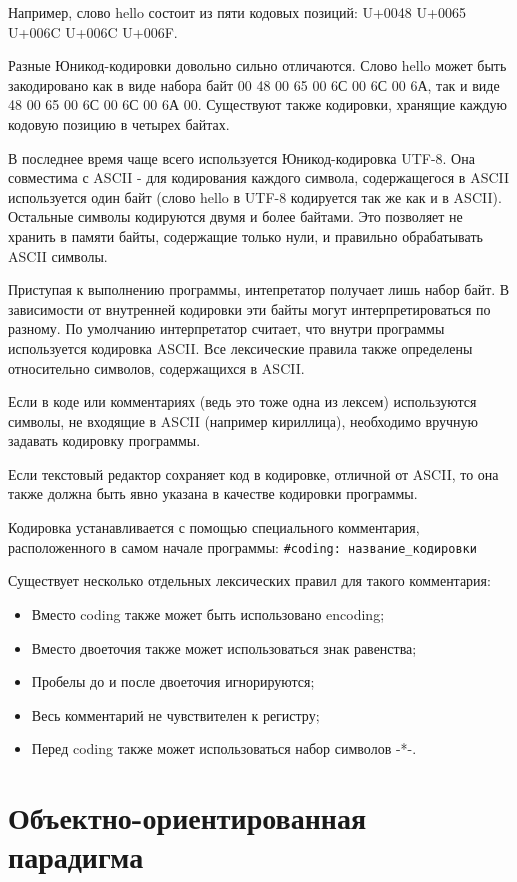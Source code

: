 Например, слово hello состоит из пяти кодовых позиций: U+0048 U+0065 U+006C U+006C U+006F.

Разные Юникод-кодировки довольно сильно отличаются. Слово hello может быть закодировано как в виде набора байт 00 48 00 65 00 6С 00 6С 00 6А, так и виде 48 00 65 00 6С 00 6С 00 6А 00. Существуют также кодировки, хранящие каждую кодовую позицию в четырех байтах.

В последнее время чаще всего используется Юникод-кодировка UTF-8. Она совместима с ASCII - для кодирования каждого символа, содержащегося в ASCII используется один байт (слово hello в UTF-8 кодируется так же как и в ASCII). Остальные символы кодируются двумя и более байтами. Это позволяет не хранить в памяти байты, содержащие только нули, и правильно обрабатывать ASCII символы.

Приступая к выполнению программы, интепретатор получает лишь набор байт. В зависимости от внутренней кодировки эти байты могут интерпретироваться по разному. По умолчанию интерпретатор считает, что внутри программы используется кодировка ASCII. Все лексические правила также определены относительно символов, содержащихся в ASCII. 

Если в коде или комментариях (ведь это тоже одна из лексем) используются символы, не входящие в ASCII (например кириллица), необходимо вручную задавать кодировку программы. 

Если текстовый редактор сохраняет код в кодировке, отличной от ASCII, то она также должна быть явно указана в качестве кодировки программы.

Кодировка устанавливается с помощью специального комментария, расположенного в самом начале программы: \verb!#coding: название_кодировки!

Существует несколько отдельных лексических правил для такого комментария:
\begin{itemize}
  \item Вместо coding также может быть использовано encoding;
  \item Вместо двоеточия также может использоваться знак равенства;
  \item Пробелы до и после двоеточия игнорируются;
  \item Весь комментарий не чувствителен к регистру;
  \item Перед coding также может использоваться набор символов -*-.
\end{itemize}

\section[Краткое описание ООП]{Объектно-ориентированная парадигма}

